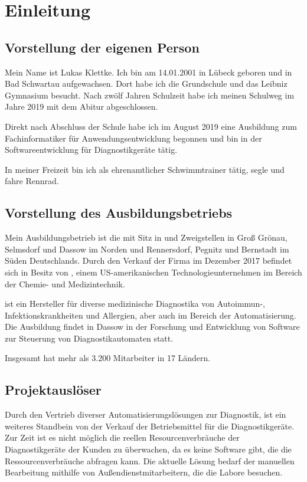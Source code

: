 \section{Einleitung}
\label{sec:Einleitung}

\subsection{Vorstellung der eigenen Person} 
\label{sec:eigene Person}
Mein Name ist Lukas Klettke. Ich bin am 14.01.2001 in Lübeck geboren und in Bad Schwartau aufgewachsen. Dort habe ich die Grundschule und das Leibniz Gymnasium besucht. Nach zwölf Jahren Schulzeit habe ich meinen Schulweg im Jahre 2019 mit dem Abitur abgeschlossen.

Direkt nach Abschluss der Schule habe ich im August 2019 eine Ausbildung zum Fachinformatiker für Anwendungsentwicklung begonnen und bin in der Softwareentwicklung für Diagnostikgeräte tätig.

In meiner Freizeit bin ich als ehrenamtlicher Schwimmtrainer tätig, segle und fahre Rennrad.

\subsection{Vorstellung des Ausbildungsbetriebs} 
\label{sec:Ausbildungsbetrieb}
Mein Ausbildungsbetrieb ist die {\betriebName} mit Sitz in {\betriebOrt} und Zweigstellen in Groß Grönau, Selmsdorf und Dassow im Norden und Rennersdorf, Pegnitz und Bernstadt im Süden Deutschlands. Durch den Verkauf der Firma im Dezember 2017 befindet sich {\betriebNameKzf} in Besitz von {\mutterBetriebName}, einem US-amerikanischen Technologieunternehmen im Bereich der Chemie- und Medizintechnik.

{\betriebNameKzf} ist ein Hersteller für diverse medizinische Diagnostika von Autoimmun-, Infektionskrankheiten und Allergien, aber auch im Bereich der Automatisierung. Die Ausbildung findet in Dassow in der Forschung und Entwicklung von Software zur Steuerung von Diagnostikautomaten statt.

Insgesamt hat {\betriebNameKzf} mehr als 3.200 Mitarbeiter in 17 Ländern.

\subsection{Projektauslöser} 
\label{sec:Projektauslöser}
Durch den Vertrieb diverser Automatisierungslösungen zur Diagnostik, ist ein weiteres Standbein von {\betriebNameKzf} der Verkauf der Betriebsmittel für die Diagnostikgeräte. Zur Zeit ist es nicht möglich die reellen Resourcenverbräuche der Diagnostikgeräte der Kunden zu überwachen, da es keine Software gibt, die die Ressourcenverbräuche abfragen kann. Die aktuelle Lösung bedarf der manuellen Bearbeitung mithilfe von Außendienstmitarbeitern, die die Labore besuchen. 

